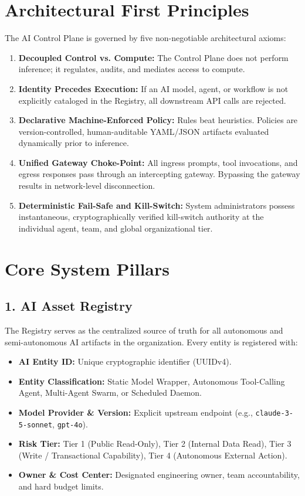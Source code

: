\documentclass[11pt,a4paper]{article}
\begin{document}
\section{Architectural First Principles}
The AI Control Plane is governed by five non-negotiable architectural axioms:
\begin{enumerate}
    \item \textbf{Decoupled Control vs. Compute:} The Control Plane does not perform inference; it regulates, audits, and mediates access to compute.
    \item \textbf{Identity Precedes Execution:} If an AI model, agent, or workflow is not explicitly cataloged in the Registry, all downstream API calls are rejected.
    \item \textbf{Declarative Machine-Enforced Policy:} Rules beat heuristics. Policies are version-controlled, human-auditable YAML/JSON artifacts evaluated dynamically prior to inference.
    \item \textbf{Unified Gateway Choke-Point:} All ingress prompts, tool invocations, and egress responses pass through an intercepting gateway. Bypassing the gateway results in network-level disconnection.
    \item \textbf{Deterministic Fail-Safe and Kill-Switch:} System administrators possess instantaneous, cryptographically verified kill-switch authority at the individual agent, team, and global organizational tier.
\end{enumerate}

\section{Core System Pillars}

\subsection{1. AI Asset Registry}
The Registry serves as the centralized source of truth for all autonomous and semi-autonomous AI artifacts in the organization. Every entity is registered with:
\begin{itemize}
    \item \textbf{AI Entity ID:} Unique cryptographic identifier (UUIDv4).
    \item \textbf{Entity Classification:} Static Model Wrapper, Autonomous Tool-Calling Agent, Multi-Agent Swarm, or Scheduled Daemon.
    \item \textbf{Model Provider \& Version:} Explicit upstream endpoint (e.g., \texttt{claude-3-5-sonnet}, \texttt{gpt-4o}).
    \item \textbf{Risk Tier:} Tier 1 (Public Read-Only), Tier 2 (Internal Data Read), Tier 3 (Write / Transactional Capability), Tier 4 (Autonomous External Action).
    \item \textbf{Owner \& Cost Center:} Designated engineering owner, team accountability, and hard budget limits.
\end{itemize}
\end{document}
